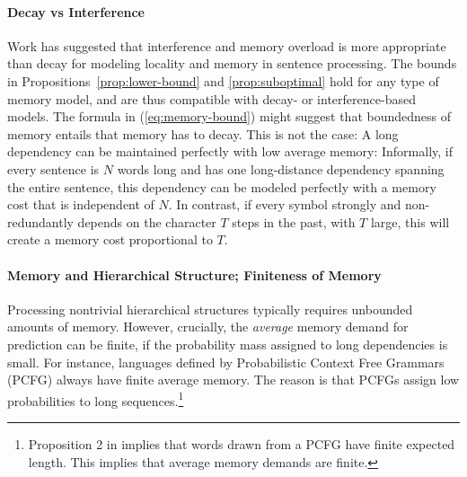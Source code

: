 \documentclass[11pt,letterpaper]{article}
\begin{document}
\paragraph{Decay vs Interference}
Work has suggested that interference and memory overload is more appropriate than decay \cite[p. 408]{lewis-activation-based-2005} for modeling locality and memory in sentence processing.
The bounds in Propositions~\ref{prop:lower-bound} and \ref{prop:suboptimal} hold for any type of memory model, and are thus compatible with decay- or interference-based models.
The formula in (\ref{eq:memory-bound}) might suggest that boundedness of memory entails that memory has to decay.
This is not the case:
A long dependency can be maintained perfectly with low average memory:
Informally, if every sentence is $N$ words long and has one long-distance dependency spanning the entire sentence, this dependency can be modeled perfectly with a memory cost that is independent of $N$.
In contrast, if every symbol strongly and non-redundantly depends on the character $T$ steps in the past, with $T$ large, this will create a memory cost proportional to $T$.




\paragraph{Memory and Hierarchical Structure; Finiteness of Memory}
Processing nontrivial hierarchical structures typically requires unbounded amounts of memory.
However, crucially, the \emph{average} memory demand for prediction can be finite, if the probability mass assigned to long dependencies is small.
For instance, languages defined by Probabilistic Context Free Grammars (PCFG) always have finite average memory.
The reason is that PCFGs assign low probabilities to long sequences.\footnote{Proposition 2 in \cite{chi-statistical-1999} implies that words drawn from a PCFG have finite expected length. This implies that average memory demands are finite.}
\end{document}
